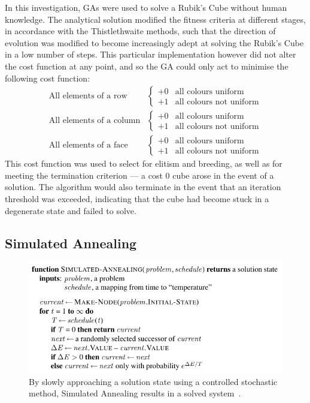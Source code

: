 \documentclass[UKenglish]{svproc}
\begin{document}
In this investigation, GAs were used to solve a Rubik's Cube without human knowledge. The analytical solution modified the fitness criteria at different stages, in accordance with the Thistlethwaite methods, such that the direction of evolution was modified to become increasingly adept at solving the Rubik's Cube in a low number of steps. This particular implementation however did not alter the cost function at any point, and so the GA could only act to minimise the following cost function:
\begin{align*}
  \text{All elements of a row} &
  \begin{cases}
    +0 & \text{all colours uniform} \\
    +1 & \text{all colours not uniform}
  \end{cases} \\
  \text{All elements of a column} &
  \begin{cases}
    +0 & \text{all colours uniform} \\
    +1 & \text{all colours not uniform}
  \end{cases} \\
  \text{All elements of a face} &
  \begin{cases}
    +0 & \text{all colours uniform} \\
    +1 & \text{all colours not uniform}
  \end{cases}
\end{align*}
This cost function was used to select for elitism and breeding, as well as for meeting the termination criterion --- a cost 0 cube arose in the event of a solution. The algorithm would also terminate in the event that an iteration threshold was exceeded, indicating that the cube had become stuck in a degenerate state and failed to solve.

\subsection{Simulated Annealing}

\begin{figure}[!ht]
  \centering
  \includegraphics[width=0.8\linewidth]{simulated-annealing}
  \caption{By slowly approaching a solution state using a controlled stochastic
    method, Simulated Annealing results in a solved
    system~\autocite{10.5555/1671238}.}
  \label{fig:simulated-annealing}
\end{figure}
\end{document}

